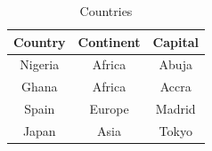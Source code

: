 \documentclass{article}
\begin{document}
 \begin{table}[h!]
  \begin{center}
  		\caption{Countries}
  	\label{table}
  	\begin{tabular}{c|c|c}
  		\textbf{Country} & \textbf{Continent} & \textbf{Capital}\\
  		\hline
  		Nigeria & Africa & Abuja\\
  		Ghana & Africa & Accra\\
  		Spain & Europe & Madrid\\
  		Japan & Asia & Tokyo\\
  	\end{tabular}
  \end{center}
 \end{table}
\end{document}
